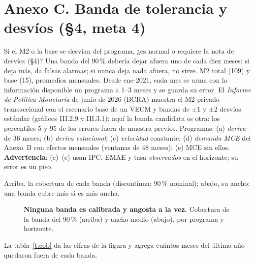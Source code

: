 \section*{Anexo C. Banda de tolerancia y desvíos (§4, meta 4)}
 Si el M2 o la base se desvían del programa, ¿es normal o requiere la nota de desvíos (§4)?
 Una banda del 90\,\% debería dejar afuera uno de cada diez meses: si deja más, da falsas alarmas; si nunca deja nada afuera, no sirve.
 M2 total (109) y base (15), promedios mensuales. Desde ene-2021, cada mes se arma con la información disponible un programa a 1--3 meses y se guarda su error. El \emph{Informe de Política Monetaria} de junio de 2026 (BCRA) muestra el M2 privado transaccional con el escenario base de un VECM y bandas de $\pm1$ y $\pm2$ desvíos estándar (gráficos III.2.9 y III.3.1); aquí la banda candidata es otra: los percentiles 5 y 95 de los errores fuera de muestra previos. Programas: (a) \emph{deriva} de 36 meses; (b) \emph{deriva estacional}; (c) \emph{velocidad} constante; (d) \emph{demanda MCE} del Anexo~B con efectos mensuales (ventanas de 48 meses); (e) MCE sin ellos. \textbf{Advertencia}: (c)--(e) usan IPC, EMAE y tasa \emph{observados} en el horizonte; su error es un piso.

 Arriba, la cobertura de cada banda (discontinua: 90\,\% nominal); abajo, su ancho: una banda cubre más si es más ancha.

\begin{figure}[H]\centering
\caption{\textbf{Ninguna banda es calibrada y angosta a la vez.} Cobertura de la banda del 90\,\% (arriba) y ancho medio (abajo), por programa y horizonte.}\label{f:cob}
\end{figure}

La tabla~\ref{t:cob} da las cifras de la figura y agrega cuántos meses del último año quedaron fuera de cada banda.

